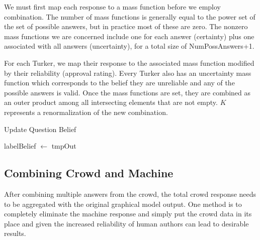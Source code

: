 We must first map each response to a mass function before we employ combination.  The number of mass functions is generally equal to the power set of the set of possible answers, but in practice most of these are zero.  The nonzero mass functions we are concerned include one for each answer (certainty) plus one associated with all answers (uncertainty), for a total size of NumPossAnswers+1.

For each Turker, we map their response to the associated mass function modified by their reliability (approval rating).  Every Turker also has an uncertainty mass function which corresponds to the belief they are unreliable and any of the possible answers is valid.  Once the mass functions are set, they are combined as an outer product among all intersecting elements that are not empty. $K$ represents a renormalization of the new combination.



\begin{algorithm}
	\SetAlgoLined
	\caption{Update Question Belief}
\end{algorithm}

\begin{algorithm}
	\SetAlgoLined
	
	labelBelief $\leftarrow$ tmpOut\;
\end{algorithm}

\subsection{Combining Crowd and Machine}

After combining multiple answers from the crowd, the total crowd response needs to be aggregated with the original graphical model output.  One method is to completely eliminate the machine response and simply put the crowd data in its place and given the increased reliability of human authors can lead to desirable results.

